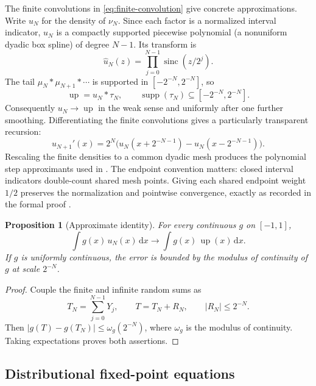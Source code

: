 \documentclass[11pt]{article}
\numberwithin{equation}{section}
\newtheorem{proposition}[theorem]{Proposition}
\theoremstyle{definition}
\theoremstyle{remark}
\DeclareMathOperator{\supp}{supp}
\newcommand{\upf}{\operatorname{up}}
\newcommand{\sinc}{\operatorname{sinc}}
\newcommand{\dd}{\,\mathrm d}
\begin{document}
The finite convolutions in \eqref{eq:finite-convolution} give concrete approximations.  Write $u_N$ for the density of $\nu_N$.  Since each factor is a normalized interval indicator, $u_N$ is a compactly supported piecewise polynomial (a nonuniform dyadic box spline) of degree $N-1$.  Its transform is
\begin{equation}\label{eq:uN-transform}
 \widehat u_N(z)=\prod_{j=0}^{N-1}\sinc(z/2^j).
\end{equation}
The tail $\mu_N*\mu_{N+1}*\cdots$ is supported in $[-2^{-N},2^{-N}]$, so
\begin{equation}\label{eq:tail-convolution}
 \upf=u_N*\tau_N,
 \qquad \supp(\tau_N)\subseteq[-2^{-N},2^{-N}].
\end{equation}
Consequently $u_N\to\upf$ in the weak sense and uniformly after one further smoothing.  Differentiating the finite convolutions gives a particularly transparent recursion:
\begin{equation}\label{eq:uN-derivative}
 u_{N+1}'(x)=2^N\bigl(u_N(x+2^{-N-1})-u_N(x-2^{-N-1})\bigr).
\end{equation}
Rescaling the finite densities to a common dyadic mesh produces the polynomial step approximants used in \cite{Arias05442}.  The endpoint convention matters: closed interval indicators double-count shared mesh points.  Giving each shared endpoint weight $1/2$ preserves the normalization and pointwise convergence, exactly as recorded in the formal proof \cite{ProveIt}.

\begin{proposition}[Approximate identity]\label{prop:approximate-identity}
For every continuous $g$ on $[-1,1]$,
\begin{equation}\label{eq:approx-identity}
 \int g(x)\,u_N(x)\dd x\longrightarrow\int g(x)\,\upf(x)\dd x.
\end{equation}
If $g$ is uniformly continuous, the error is bounded by the modulus of continuity of $g$ at scale $2^{-N}$.
\end{proposition}

\begin{proof}
Couple the finite and infinite random sums as
\[
 T_N=\sum_{j=0}^{N-1}Y_j,
 \qquad T=T_N+R_N,
 \qquad |R_N|\le2^{-N}.
\]
Then $|g(T)-g(T_N)|\le\omega_g(2^{-N})$, where $\omega_g$ is the modulus of continuity.  Taking expectations proves both assertions.
\end{proof}

\subsection{Distributional fixed-point equations}
\end{document}
